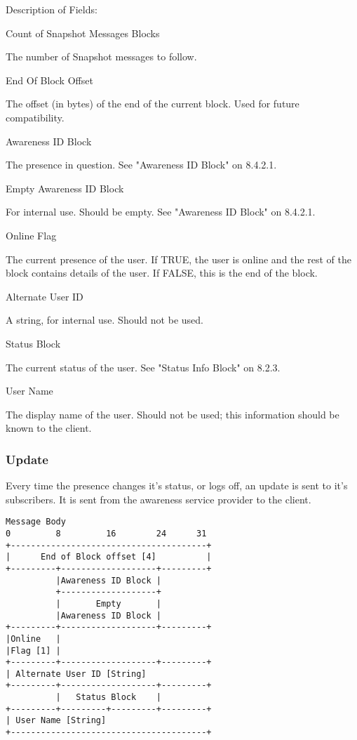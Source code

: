 \documentclass[titlepage,oneside]{book}
\begin{document}
\par{} Description of Fields:

\par{} Count of Snapshot Messages Blocks

\subpar{}  The number of Snapshot messages to follow.

\par{} End Of Block Offset

\subpar{}  The offset (in bytes) of the end of the current block. Used for
  future compatibility.

\par{} Awareness ID Block

\subpar{}  The presence in question. See "Awareness ID Block" on
8.4.2.1.

\par{} Empty Awareness ID Block

\subpar{}  For internal use. Should be empty. See "Awareness ID Block" on
  8.4.2.1.

\par{} Online Flag

\subpar{}  The current presence of the user. If TRUE, the user is online and
  the rest of the block contains details of the user. If FALSE, this
  is the end of the block.

\par{} Alternate User ID

\subpar{}  A string, for internal use. Should not be used.

\par{} Status Block

\subpar{}  The current status of the user. See "Status Info Block" on
8.2.3.

\par{} User Name

\subpar{}  The display name of the user. Should not be used; this information
  should be known to the client.

\subsubsection{Update}

\par{} Every time the presence changes it's status, or logs off, an update is
sent to it's subscribers. It is sent from the awareness service
provider to the client.

\begin{verbatim}
Message Body
0         8         16        24      31
+---------------------------------------+
|      End of Block offset [4]          |
+---------+-------------------+---------+
          |Awareness ID Block |
          +-------------------+
          |       Empty       |
          |Awareness ID Block |
+---------+-------------------+---------+
|Online   |
|Flag [1] |
+---------+-------------------+---------+
| Alternate User ID [String]
+---------+-------------------+---------+
          |   Status Block    |
+---------+---------+---------+---------+
| User Name [String]
+---------------------------------------+
\end{verbatim}
\end{document}
